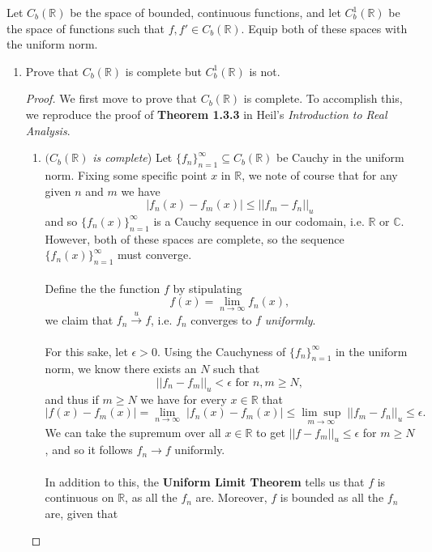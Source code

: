 \documentclass[12pt]{article}
\newenvironment{ex}[2][Exercise]{\begin{trivlist}
\item[\hskip \labelsep {\bfseries #1}\hskip \labelsep {\bfseries #2.}]}{\end{trivlist}}
\begin{document}
\begin{ex}{3}
    Let $C_b(\mathbb{R})$ be the space of bounded, continuous functions, and let $C_b^1(\mathbb{R})$ be the space of functions such that $f, f' \in C_b(\mathbb{R})$. Equip both of these spaces with the uniform norm. 
    \begin{enumerate}[label=(\alph*)]
        \item Prove that $C_b(\mathbb{R})$ is complete but $C_b^1(\mathbb{R})$ is not. 
        \begin{proof}
            We first move to prove that $C_b(\mathbb{R})$ is complete. To accomplish this, we reproduce the proof of \textbf{Theorem 1.3.3} in Heil's \textit{Introduction to Real Analysis}.
            \begin{enumerate}[label=(\roman*)]
            \item $(C_b(\mathbb{R})$\textit{ is complete})
            Let $\{f_n\}_{n = 1}^\infty \subseteq C_b(\mathbb{R})$ be Cauchy in the uniform norm. Fixing some specific point $x$ in $\mathbb{R}$, we note of course that for any given $n$ and $m$ we have
            $$|f_n(x) - f_m(x)| \leq ||f_m - f_n||_u$$
            and so $\{f_n(x)\}_{n = 1}^\infty$ is a Cauchy sequence in our codomain, i.e. $\mathbb{R}$ or $\mathbb{C}$. However, both of these spaces are complete, so the sequence $\{f_n(x)\}_{n = 1}^\infty$ must converge. \\ \\
            Define the the function $f$ by stipulating
            $$f(x) = \underset{n \rightarrow \infty}{\lim} f_n(x),$$
            we claim that $f_n \xrightarrow{u} f$, i.e. $f_n$ converges to $f$ \textit{uniformly}. \\ \\
            For this sake, let $\epsilon > 0$. Using the Cauchyness of $\{f_n\}_{n = 1}^\infty$ in the uniform norm, we know there exists an $N$ such that 
            $$||f_n - f_m||_u < \epsilon \text{ for } n, m \geq N,$$
            and thus if $m \geq N$ we have for every $x \in \mathbb{R}$ that 
            $$|f(x) - f_m(x)| = \underset{n \rightarrow \infty}{\lim} \; |f_n(x) - f_m(x)| \leq \underset{m \rightarrow \infty}{\lim \sup} \; ||f_m - f_n||_u \leq \epsilon.$$
            We can take the supremum over all $x \in \mathbb{R}$ to get $||f - f_m||_u \leq \epsilon$ for $m \geq N$, and so it follows $f_n \rightarrow f$ uniformly. \\ \\
            In addition to this, the \textbf{Uniform Limit Theorem} tells us that $f$ is continuous on $\mathbb{R}$, as all the $f_n$ are. Moreover, $f$ is bounded as all the $f_n$ are, given that 

\end{enumerate}
\end{proof}
\end{enumerate}
\end{ex}
\end{document}
